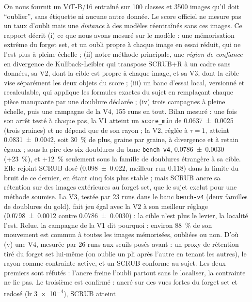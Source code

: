 \documentclass[11pt,a4paper]{article}
\newcommand{\code}[1]{\texttt{#1}}
\begin{document}
\vspace{0.6em}
\begin{retenir}[Résumé]
On nous fournit un ViT-B/16 entraîné sur 100 classes et \num{3500} images qu'il doit
\enquote{oublier}, sans étiquette ni aucune autre donnée. Le score officiel ne mesure pas un taux
d'oubli mais une \emph{distance} à des modèles réentraînés sans ces images. Ce rapport décrit
(i) ce que nous avons mesuré sur le modèle : une mémorisation extrême du forget set, et un oubli
propre à chaque image en essai réduit, qui ne l'est plus à pleine échelle ; (ii) notre méthode
principale, une \emph{région de confiance} en divergence de Kullback-Leibler qui transpose SCRUB+R
à un cadre sans données, sa V2, dont la cible est propre à chaque image, et sa V3, dont la cible
vise séparément les deux objets du score ; (iii) un banc
d'essai local, versionné et recalculable, qui applique les formules exactes du sujet en
remplaçant chaque pièce manquante par une doublure déclarée ; (iv) trois campagnes à pleine
échelle, puis une campagne de la V4, 155 runs en tout. Bilan mesuré : une fois son arrêt testé à
chaque pas, la V1 atteint un \code{score\_min} de \num{0.0637 +- 0.0025} (trois graines) et ne
dépend que de son rayon ; la V2, réglée à $\tau=1$, atteint \num{0.0831 +- 0.0042}, soit
\SI{30}{\percent} de plus, graine par graine, à divergence et à retain égaux ; sous la pire des six
doublures du banc \code{bench-v4}, \num{0.0786 +- 0.0030} (+\SI{23}{\percent}), et +\SI{12}{\percent}
seulement sous la famille de doublures étrangère à sa cible. Elle rejoint SCRUB
dosé (\num{0.098 +- 0.022}, meilleur run \num{0.118}) dans la limite du bruit de ce dernier, en
étant cinq fois plus stable ; mais SCRUB ancre sa rétention sur des images extérieures au forget
set, que le sujet exclut pour une méthode soumise. La V3, testée par 23 runs dans le banc \code{bench-v4} (deux familles de
doublures du gold), fait jeu égal avec la V2 à son meilleur réglage (\num{0.0798 +- 0.0012} contre
\num{0.0786 +- 0.0030}) : la cible n'est plus le levier, la localité l'est. Relue, la campagne de la
V1 dit pourquoi : environ \SI{88}{\percent} de son mouvement est commun à toutes les images
mémorisées, oubliées ou non. D'où (v) une V4, mesurée par 26 runs aux seuils posés avant : un
proxy de rétention tiré du forget set lui-même (on oublie un pli après l'autre en tenant les
autres), le rayon comme contrainte active, et un SCRUB conforme au sujet. Les deux premiers sont
réfutés : l'ancre freine l'oubli partout sans le localiser, la contrainte ne lie pas. Le troisième
est confirmé : ancré sur des vues fortes du forget set et redosé (lr \num{3e-4}), SCRUB atteint

\end{retenir}
\end{document}
